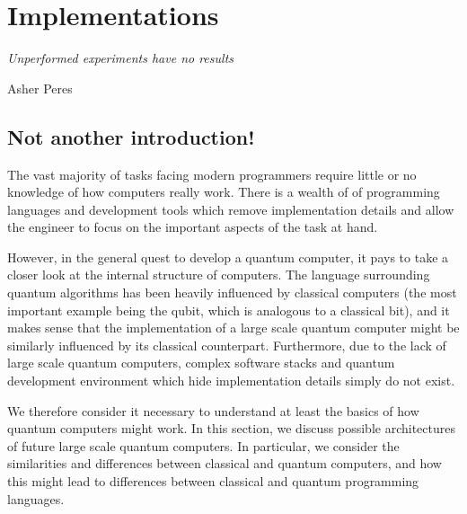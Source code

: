 \chapter{Implementations}
\label{Implementations}

\epigraph{\textit{Unperformed experiments have no results}}{Asher Peres}

\section{Not another introduction!}

The vast majority of tasks facing modern programmers require little or no knowledge of how computers really work. There is a wealth of of programming languages and development tools which remove implementation details and allow the engineer to focus on the important aspects of the task at hand.

However, in the general quest to develop a quantum computer, it pays to take a closer look at the internal structure of computers. The language surrounding quantum algorithms has been heavily influenced by classical computers (the most important example being the qubit, which is analogous to a classical bit), and it makes sense that the implementation of a large scale quantum computer might be similarly influenced by its classical counterpart. Furthermore, due to the lack of large scale quantum computers, complex software stacks and quantum development environment which hide implementation details simply do not exist.

We therefore consider it necessary to understand at least the basics of how quantum computers might work. In this section, we discuss possible architectures of future large scale quantum computers. In particular, we consider the similarities and differences between classical and quantum computers, and how this might lead to differences between classical and quantum programming languages.

